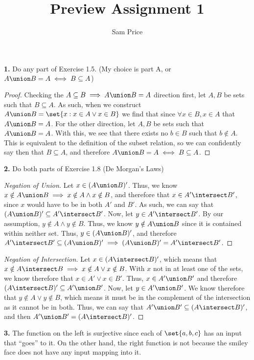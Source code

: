 \documentclass{article}
\author{Sam Price}
\title{Preview Assignment 1}
\begin{document}
\maketitle

\noindent\textbf{1.} Do any part of Exercise 1.5. (My choice is part A, or $A \union B = A \iff B \subseteq A$)
\begin{proof}
Checking the $A \subseteq B \implies A \union B = A$ direction first, let $A, B$ be sets such that $B \subseteq A$.
As such, when we construct $A \union B = \set{x : x \in A \lor x \in B}$ we find that since $\forall x \in B, x \in A$ that $A \union B = A$.
For the other direction, let $A, B$ be sets such that $A \union B = A$. With this, we see that there exists no $b \in B$ such that $b \notin A$.
This is equivalent to the definition of the subset relation, so we can confidently say then that $B \subseteq A$, and therefore $A \union B = A \iff B \subseteq A$.
\end{proof}

\noindent\textbf{2.} Do both parts of Exercise 1.8 (De Morgan's Laws)
\begin{proof}[Negation of Union]
  Let $x \in (A \union B)'$. Thus, we know $x \notin A \union B \implies x \notin A \land x \notin B$, and therefore that $x \in A' \intersect B'$, since
  $x$ would have to be in both $A'$ and $B'$. As such, we can say that $(A \union B)' \subseteq A' \intersect B'$.
  Now, let $y \in A' \intersect B'$. By our assumption, $y \notin A \land y \notin B$. Thus, we know $y \notin A \union B$ since it is contained within neither set.
  Thus, $y \in (A \union B)'$, and therefore $A' \intersect B' \subseteq (A \union B)' \implies (A \union B)' = A' \intersect B'$.
\end{proof}
\begin{proof}[Negation of Intersection]
  Let $x \in (A \intersect B)'$, which means that $x \notin A \intersect B \implies x \notin A \lor x \notin B$. With $x$ not in at least one of the sets, we know therefore
  that $x \in A' \lor x \in B'$. Thus, $x \in A' \union B'$ and therefore $(A \intersect B)' \subseteq A' \union B'$. Now, let $y \in A' \union B'$.
  We know therefore that $y \notin A \lor y \notin B$, which means it must be in the complement of the intersection as it cannot be in both.
  Thus, we can say that $A' \union B' \subseteq (A \intersect B)'$, and then $A' \union B' = (A \intersect B)'$.
\end{proof}

\noindent\textbf{3.} The function on the left is surjective since each of $\set{a, b, c}$ has an input that ``goes'' to it.
On the other hand, the right function is not because the smiley face does not have any input mapping into it.\\
\end{document}
